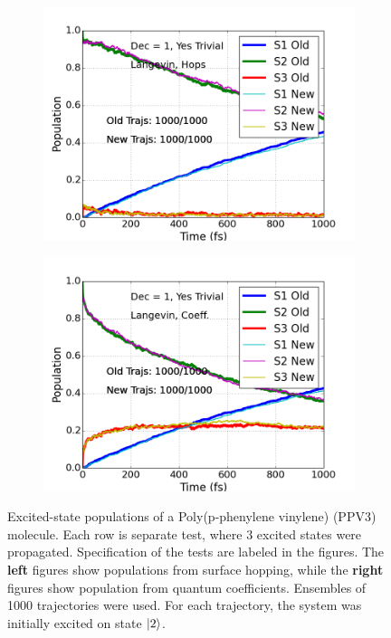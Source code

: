 \documentclass[letterpaper,12pt,titlepage]{article}
\begin{document}
\begin{appendix}
\begin{figure}[h]
\begin{subfigure}[h]{0.425\textwidth}
        \end{subfigure}
	\begin{subfigure}[h]{0.425\textwidth}  
            \centering 
            \includegraphics[scale=.35]{ppv_es_traj_decohere1_yestrivial_langevin_hops_old_v_new.png}
        \end{subfigure}
	\hspace{3mm}
        \begin{subfigure}[h]{0.425\textwidth}   
            \centering 
            \includegraphics[scale=.35]{ppv_es_traj_decohere1_yestrivial_langevin_coeff_old_v_new.png}
        \end{subfigure}
        \caption{\small Excited-state populations of a Poly(p-phenylene vinylene) (PPV3) molecule.  Each row is separate test, where 3 excited states were propagated.  Specification of the tests are labeled in the figures.  The {\textbf{left}} figures show populations from surface hopping, while the {\textbf{right}} figures show population from quantum coefficients.  Ensembles of 1000 trajectories were used.  For each trajectory, the system was initially excited on state $\ket{2}$.} 

\end{figure}
\end{appendix}
\end{document}
